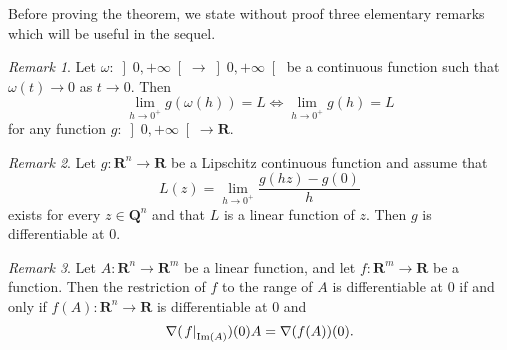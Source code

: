 \documentclass{article}
\theoremstyle{definition}
\theoremstyle{remark}
\newtheorem{rem}{Remark}[section]
\DeclareMathOperator{\IM}{Im}
\newcommand{\eval}[2][\right]{\relax
  \ifx#1\right\relax \left.\fi#2#1\rvert}
\begin{document}
Before proving the theorem, we state without proof three elementary
remarks which will be useful in the sequel.
\begin{rem}\label{r:omb}
Let $\omega\colon \left]0,+\infty\right[\to \left]0,+\infty\right[$
be a continuous function such that $\omega (t)\to 0$ as $t\to
0$. Then
\[\lim_{h\to 0^+}g(\omega(h))=L\Leftrightarrow\lim_{h\to
0^+}g(h)=L\]
for any function $g\colon \left]0,+\infty\right[\to \mathbf{R}$.
\end{rem}
\begin{rem}\label{r:dif}
Let $g \colon  \mathbf{R}^n\to \mathbf{R}$ be a Lipschitz
continuous function and assume that
\[L(z)=\lim_{h\to 0^+}\frac{g(hz)-g(0)}h\]
exists for every $z\in\mathbf{Q}^n$ and that $L$ is a linear function of
$z$. Then $g$ is differentiable at 0.
\end{rem}
\begin{rem}\label{r:dif0}
Let $A \colon \mathbf{R}^n\to \mathbf{R}^m$ be a linear function, and
let $f \colon \mathbf{R}^m\to \mathbf{R}$ be a function. Then the
restriction of $f$ to the range of $A$ is differentiable at 0 if and
only if $f(A)\colon \mathbf{R}^n\to \mathbf{R}$ is differentiable at 0
and
\[\nabla(\eval{f}_{\IM(A)})(0)A=\nabla (f(A))(0).\]
\end{rem}
\end{document}

